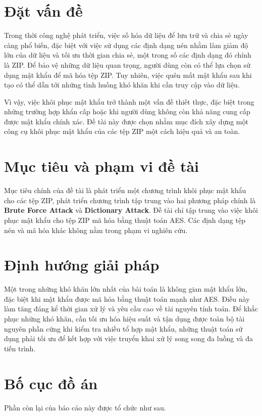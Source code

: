 \documentclass[../DoAn.tex]{subfiles}
\begin{document}
\section{Đặt vấn đề}
\label{section:1.1}
Trong thời công nghệ phát triển, việc số hóa dữ liệu để lưu trữ và chia sẻ ngày càng phổ biến, đặc biệt với việc sử dụng các định dạng nén nhằm làm giảm độ lớn của dữ liệu và tối ưu thời gian chia sẻ, một trong số các định dạng đó chính là ZIP. Để bảo vệ những dữ liệu quan trọng, người dùng còn có thể lựa chọn sử dụng mật khẩu để mã hóa tệp ZIP. Tuy nhiên, việc quên mất mật khẩu sau khi tạo có thể dẫn tới những tình huống khó khăn khi cần truy cập vào dữ liệu.

Vì vậy, việc khôi phục mật khẩu trở thành một vấn đề thiết thực, đặc biệt trong những trường hợp khẩn cấp hoặc khi người dùng không còn khả năng cung cấp được mật khẩu chính xác. Đề tài này được chọn nhằm mục đích xây dựng một công cụ khôi phục mật khẩu của các tệp ZIP một cách hiệu quả và an toàn.


\section{Mục tiêu và phạm vi đề tài}
\label{section:1.2}
Mục tiêu chính của đề tài là phát triển một chương trình khôi phục mật khẩu cho các tệp ZIP, phát triển chương trình tập trung vào hai phương pháp chính là \textbf{Brute Force Attack} và \textbf{Dictionary Attack}. Đề tài chỉ tập trung vào việc khôi phục mật khẩu cho tệp ZIP mã hóa bằng thuật toán AES. Các định dạng tệp nén và mã hóa khác không nằm trong phạm vi nghiên cứu. 

\section{Định hướng giải pháp}
\label{section:1.3}
Một trong những khó khăn lớn nhất của bài toán là không gian mật khẩu lớn, đặc biệt khi mật khẩu được mã hóa bằng thuật toán mạnh như AES. Điều này làm tăng đáng kể thời gian xử lý và yêu cầu cao về tài nguyên tính toán. Để khắc phục những khó khăn, cần tối ưu hóa hiệu suất và tận dụng được toàn bộ tài nguyên phần cứng khi kiểm tra nhiều tổ hợp mật khẩu, những thuật toán sử dụng phải tối ưu để kết hợp với việc truyển khai xử lý song song đa luồng và đa tiến trình.

\section{Bố cục đồ án}
\label{section:1.4}
Phần còn lại của báo cáo này được tổ chức như sau. 
\end{document}
